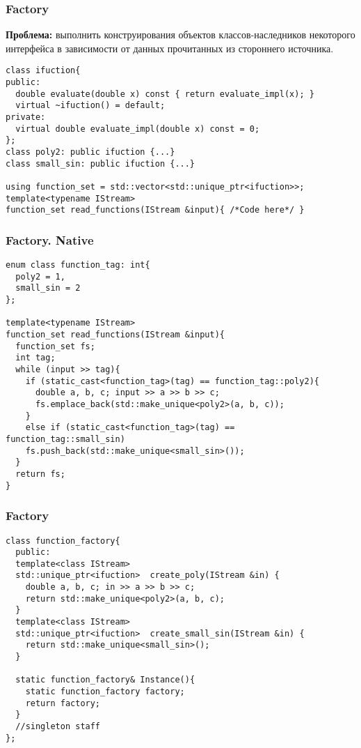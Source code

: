 \begin{frame}[fragile]
  \frametitle{Factory}
  \textbf{Проблема:} выполнить конструирования объектов классов-наследников некоторого интерфейса в зависимости 
  от данных прочитанных из стороннего источника.
  
  \begin{verbatim}
class ifuction{
public:
  double evaluate(double x) const { return evaluate_impl(x); }
  virtual ~ifuction() = default;
private:
  virtual double evaluate_impl(double x) const = 0;
};
class poly2: public ifuction {...}
class small_sin: public ifuction {...}

using function_set = std::vector<std::unique_ptr<ifuction>>;
template<typename IStream>
function_set read_functions(IStream &input){ /*Code here*/ }
  \end{verbatim}
\end{frame}

\begin{frame}[fragile]
  \frametitle{Factory. Native} 
  \begin{verbatim}
enum class function_tag: int{
  poly2 = 1,
  small_sin = 2
};

template<typename IStream>
function_set read_functions(IStream &input){
  function_set fs;
  int tag;
  while (input >> tag){
    if (static_cast<function_tag>(tag) == function_tag::poly2){
      double a, b, c; input >> a >> b >> c;
      fs.emplace_back(std::make_unique<poly2>(a, b, c));
    }
    else if (static_cast<function_tag>(tag) == function_tag::small_sin)
    fs.push_back(std::make_unique<small_sin>());
  }
  return fs;
}
  \end{verbatim}
\end{frame}

\begin{frame}[fragile]
  \frametitle{Factory} 
  \begin{verbatim}
class function_factory{
  public:
  template<class IStream>
  std::unique_ptr<ifuction>  create_poly(IStream &in) {
    double a, b, c; in >> a >> b >> c;
    return std::make_unique<poly2>(a, b, c);
  }
  template<class IStream>
  std::unique_ptr<ifuction>  create_small_sin(IStream &in) {
    return std::make_unique<small_sin>();
  }
  
  static function_factory& Instance(){
    static function_factory factory;
    return factory;
  }
  //singleton staff
};
  \end{verbatim}
\end{frame}

